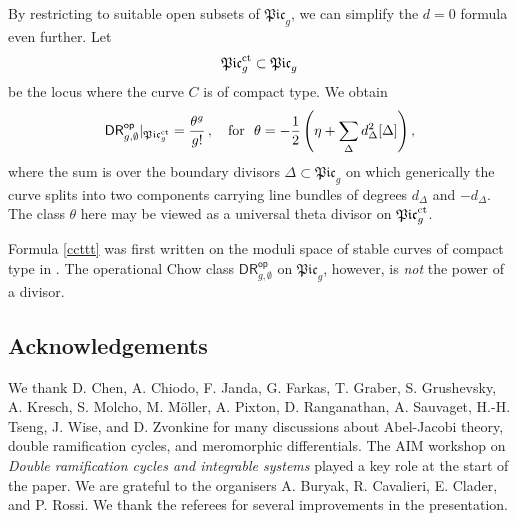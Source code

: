 \documentclass[a4paper,12pt]{article} %
\def\P{\mathsf{P}}
\def\DR{\mathsf{DR}}
\theoremstyle{definition}
\theoremstyle{plain}%
\newcommand{\Picabs}{\mathfrak{Pic}}
\newcommand{\jocomment}[1]{}
\newcommand{\DRop}{\mathsf{DR}^{\mathsf{op}}}
\begin{document}

By restricting to suitable open subsets of $\Picabs_{g}$, we can simplify the $d=0$ formula even further. Let $$\Picabs_{g}^\textup{ct} \subset \Picabs_{g}$$
be the locus where the curve $C$ is of compact type. 
We obtain 
\begin{equation}\label{ccttt}
 \DRop_{g,\emptyset}|_{\Picabs_{g}^\textup{ct}} 
 = \frac{\theta^g}{g!} \,, \ \ \  
 \text{for}\ \ \theta = -\frac12 \left(\eta +  \sum_{\Delta} d_\Delta^2 [\Delta] \right),
\end{equation}
where the sum is over the boundary divisors $\Delta \subset \Picabs_g$ on which generically the curve splits into two components carrying line bundles of degrees $d_\Delta$ and $-d_\Delta$. 
The class $\theta$ here may be viewed as a universal theta divisor on $\Picabs_{g}^\textup{ct}$. 

Formula \eqref{ccttt} was first written on the moduli space of stable curves of compact type in 
\cite{Grushevsky2012The-double-rami,Hain2013Normal-function}. The operational Chow class  $\DRop_{g,\emptyset}$ on $\Picabs_g$,
however, is {\em not} the  power of a divisor. 







\subsection{Acknowledgements}
We thank D. Chen, A. Chiodo, F. Janda, G. Farkas, T. Graber, S. Grushevsky, A. Kresch,
S. Molcho, M. M\"oller, A. Pixton, D. Ranganathan, A. Sauvaget, H.-H. Tseng,
J. Wise, and D. Zvonkine
for  
many discussions about Abel-Jacobi theory, double ramification cycles,
and meromorphic differentials. The AIM workshop on {\em Double ramification cycles and integrable systems} 
played a key role at the start of the paper. We are grateful to the organisers A. Buryak, R. Cavalieri, E. Clader, and P. Rossi. We thank the referees for several 
improvements in the presentation.
\end{document}
